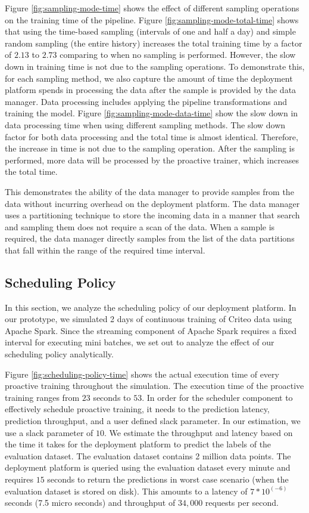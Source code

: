 Figure \ref{fig:sampling-mode-time} shows the effect of different sampling operations on the training time of the pipeline.
Figure \ref{fig:sampling-mode-total-time} shows that using the time-based sampling (intervals of one and half a day) and simple random sampling (the entire history) increases the total training time by a factor of $2.13$ to $2.73$ comparing to when no sampling is performed.
However, the slow down in training time is not due to the sampling operations.
To demonstrate this, for each sampling method, we also capture the amount of time the deployment platform spends in processing the data after the sample is provided by the data manager.
Data processing includes applying the pipeline transformations and training the model.
Figure \ref{fig:sampling-mode-data-time} show the slow down in data processing time when using different sampling methods.
The slow down factor for both data processing and the total time is almost identical.
Therefore, the increase in time is not due to the sampling operation.
After the sampling is performed, more data will be processed by the proactive trainer, which increases the total time.

This demonstrates the ability of the data manager to provide samples from the data without incurring overhead on the deployment platform.
The data manager uses a partitioning technique to store the incoming data in a manner that search and sampling them does not require a scan of the data.
When a sample is required, the data manager directly samples from the list of the data partitions that fall within the range of the required time interval.

\subsection{Scheduling Policy}
In this section, we analyze the scheduling policy of our deployment platform.
In our prototype, we simulated 2 days of continuous training of Criteo data using Apache Spark.
Since the streaming component of Apache Spark requires a fixed interval for executing mini batches, we set out to analyze the effect of our scheduling policy analytically.

Figure \ref{fig:scheduling-policy-time} shows the actual execution time of every proactive training throughout the simulation.
The execution time of the proactive training ranges from $23$ seconds to $53$.
In order for the scheduler component to effectively schedule proactive training, it needs to the prediction latency, prediction throughput, and a user defined slack parameter.
In our estimation, we use a slack parameter of $10$.
We estimate the throughput and latency based on the time it takes for the deployment platform to predict the labels of the evaluation dataset.
The evaluation dataset contains 2 million data points.
The deployment platform is queried using the evaluation dataset every minute and requires $15$ seconds to return the predictions in worst case scenario (when the evaluation dataset is stored on disk). 
This amounts to a latency of $7 * 10 ^ {(-6)}$ seconds (7.5 micro seconds) and throughput of $34,000$ requests per second.

